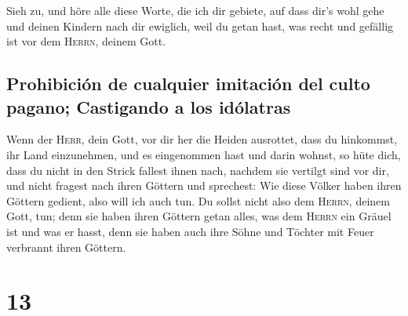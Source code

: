  Sieh zu, und höre alle diese Worte, die ich dir gebiete,
auf dass dir's wohl gehe und deinen Kindern nach dir ewiglich, weil du
getan hast, was recht und gefällig ist vor dem \textsc{Herrn}, deinem
Gott.

\hypertarget{prohibiciuxf3n-de-cualquier-imitaciuxf3n-del-culto-pagano-castigando-a-los-iduxf3latras}{%
\subsection{Prohibición de cualquier imitación del culto pagano;
Castigando a los
idólatras}\label{prohibiciuxf3n-de-cualquier-imitaciuxf3n-del-culto-pagano-castigando-a-los-iduxf3latras}}

 Wenn der \textsc{Herr}, dein Gott, vor dir her die
Heiden ausrottet, dass du hinkommst, ihr Land einzunehmen, und es
eingenommen hast und darin wohnst,  so hüte dich, dass du
nicht in den Strick fallest ihnen nach, nachdem sie vertilgt sind vor
dir, und nicht fragest nach ihren Göttern und sprechest: Wie diese
Völker haben ihren Göttern gedient, also will ich auch tun.
 Du sollst nicht also dem \textsc{Herrn}, deinem Gott,
tun; denn sie haben ihren Göttern getan alles, was dem \textsc{Herrn}
ein Gräuel ist und was er hasst, denn sie haben auch ihre Söhne und
Töchter mit Feuer verbrannt ihren Göttern.

\hypertarget{section-12}{%
\section{13}\label{section-12}}

